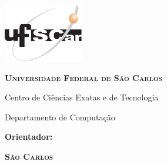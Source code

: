 \includegraphics[width=.94in, height=1in, keepaspectratio=true]{images/LogoUFSCar}
\vspace*{1cm}
\begin{center}
    
	    {\large \scshape \bfseries Universidade Federal de São Carlos \\

    \vspace{.5cm}

    Centro de Ciências Exatas e de Tecnologia \\

     \vspace{.5cm}

   Departamento de Computação}
\end{center}
\vspace{2cm}
\begin{center}
    {\Large \scshape \autor}
\end{center}
\vspace{2cm}
\begin{center}
    {\Large \scshape \bfseries \titulo}
\end{center}
\vspace{2cm}
{\bfseries
\noindent
Orientador:  \orientador
}
\vspace{.25cm}
\vfill
\begin{center}
    {\scshape \bfseries São Carlos \\ \ano}
\end{center}
